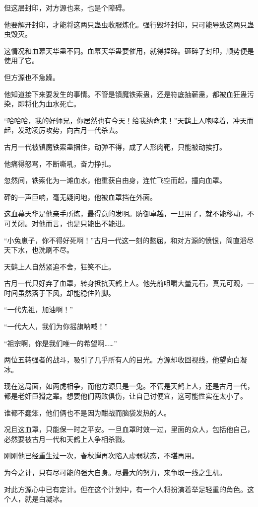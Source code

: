 \begin{this_body}
但这层封印，对方源也来，也是个障碍。

他要解开封印，才能将这两只蛊虫收服炼化。强行毁坏封印，只可能导致这两只蛊虫毁灭。

这情况和血幕天华蛊不同。血幕天华蛊要催用，就得捏碎。砸碎了封印，顺势便是使用了它。

但方源也不急躁。

他知道接下来要发生的事情。不管是镇魔铁索蛊，还是符底抽薪蛊，都被血狂蛊污染，即将化为血水死亡。

“哈哈哈，我的好师兄，你居然也有今天！给我纳命来！”天鹤上人咆哮着，冲天而起，发动凌厉攻势，向古月一代杀去。

古月一代被镇魔铁索蛊捆住，动弹不得，成了人形肉靶，只能被动挨打。

他痛得怒骂，不断嘶吼，奋力挣扎。

忽然间，铁索化为一滩血水，他重获自由身，连忙飞空而起，撞向血罩。

砰的一声巨响，毫无疑问地，他被血罩挡在外面。

这血幕天华是他亲手所炼，最得意的发明。防御卓越，一旦用了，就不能移动，不可关闭。对他而言，也是只能出不能进。

“小兔崽子，你不得好死啊！”古月一代这一刻的憋屈，和对方源的愤恨，简直滔尽天下水，也洗刷不尽。

天鹤上人自然紧追不舍，狂笑不止。

古月一代只好弃了血罩，转身抵抗天鹤上人。他先前咀嚼大量元石，真元可观，一时间虽然落于下风，却能稳住阵脚。

“一代先祖，加油啊！”

“一代大人，我们为你摇旗呐喊！”

“祖宗啊，你是我们唯一的希望啊……”

两位五转强者的战斗，吸引了几乎所有人的目光。方源却收回视线，他望向白凝冰。

现在这局面，如两虎相争，而他方源只是一兔。不管是天鹤上人，还是古月一代，都是老奸巨猾之辈。想要他们两败俱伤，让自己讨便宜，这可能性实在太小了。

谁都不蠢笨，他们俩也不是因为酣战而脑袋发热的人。

况且这血罩，只能保一时之平安。一旦血罩时效一过，里面的众人，包括他自己，必然要被古月一代和天鹤上人争相杀戮。

刚刚他已经重生过一次，春秋蝉再次陷入虚弱状态，不堪再用。

为今之计，只有尽可能的强大自身。尽最大的努力，来争取一线之生机。

对此方源心中已有定计。但在这个计划中，有一个人将扮演着举足轻重的角色。这个人，就是白凝冰。


\end{this_body}
